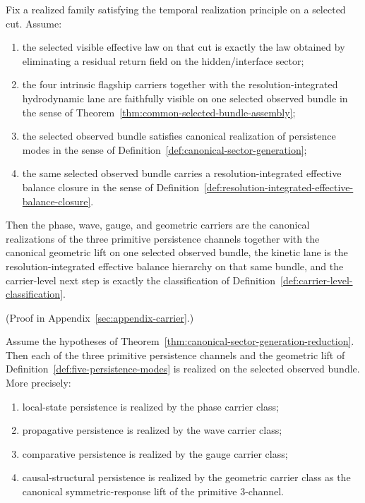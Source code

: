 \begin{theorem}
\label{thm:canonical-sector-generation-reduction}
Fix a realized family satisfying the temporal realization principle on a
selected cut. Assume:
\begin{enumerate}[label=(\roman*), leftmargin=2em, itemsep=0.2em]
\item the selected visible effective law on that cut is exactly the law
      obtained by eliminating a residual return field on the hidden/interface
      sector;
\item the four intrinsic flagship carriers together with the
      resolution-integrated hydrodynamic lane are faithfully visible on one selected
      observed bundle in the sense of
      Theorem~\ref{thm:common-selected-bundle-assembly};
\item the selected observed bundle satisfies canonical realization of
      persistence modes in the sense of
      Definition~\ref{def:canonical-sector-generation};
\item the same selected observed bundle carries a resolution-integrated
      effective balance closure in the sense of
      Definition~\ref{def:resolution-integrated-effective-balance-closure}.
\end{enumerate}
Then the phase, wave, gauge, and geometric carriers are the canonical
realizations of the three primitive persistence channels together with the
canonical geometric lift on one selected observed bundle, the kinetic lane is
the resolution-integrated effective balance
hierarchy on that same bundle, and the carrier-level next step is exactly the
classification of
Definition~\ref{def:carrier-level-classification}.
\end{theorem}

(Proof in Appendix~\ref{sec:appendix-carrier}.)

\begin{theorem}
\label{thm:existence-of-five-persistence-modes}
Assume the hypotheses of
Theorem~\ref{thm:canonical-sector-generation-reduction}. Then each of the three
primitive persistence channels and the geometric lift of
Definition~\ref{def:five-persistence-modes} is realized on the selected
observed bundle. More precisely:
\begin{enumerate}[label=(\roman*), leftmargin=2em, itemsep=0.2em]
\item local-state persistence is realized by the phase carrier class;
\item propagative persistence is realized by the wave carrier class;
\item comparative persistence is realized by the gauge carrier class;
\item causal-structural persistence is realized by the geometric carrier class
      as the canonical symmetric-response lift of the primitive \(3\)-channel.
\end{enumerate}
\end{theorem}

